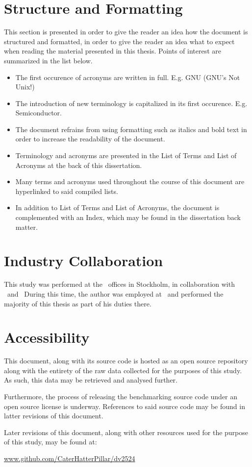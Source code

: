 \section*{Structure and Formatting}
\label{sec:preface_structureandformatting}
This section is presented in order to give the reader an idea how the document is structured and formatted, in order to give the reader an idea what to expect when reading the material presented in this thesis.
Points of interest are summarized in the list below.
\begin{itemize}[noitemsep]
	\item The first occurence of acronyms are written in full. E.g. GNU (GNU's Not Unix!)
	\item The introduction of new terminology is capitalized in its first occurence. E.g. Semiconductor.
	\item The document refrains from using formatting such as italics and bold text in order to increase the readability of the document.
	\item Terminology and acronyms are presented in the List of Terms and List of Acronyms at the back of this dissertation.
	\item Many terms and acronyms used throughout the course of this document are hyperlinked to said compiled lists.
	\item In addition to List of Terms and List of Acronyms, the document is complemented with an Index, which may be found in the dissertation back matter.
\end{itemize}

\section*{Industry Collaboration}
\label{sec:preface_industrycollaboration}
This study was performed at the \dvttermintel\ offices in Stockholm, in collaboration with \dvttermintel\ and \dvttermwindriver\
During this time, the author was employed at \dvttermintel\ and performed the majority of this thesis as part of his duties there.

\section*{Accessibility}
\label{sec:preface_accessibility}
This document, along with its source code is hosted as an open source repository along with the entirety of the raw data collected for the purposes of this study.
As such, this data may be retrieved and analysed further.

Furthermore, the process of releasing the benchmarking source code under an open source license is underway.
References to said source code may be found in latter revisions of this document.

Later revisions of this document, along with other resources used for the purpose of this study, may be found at:
\begin{center}
\href{https://github.com/CaterHatterPillar/dv2524}{www.github.com/CaterHatterPillar/dv2524}
\end{center}
